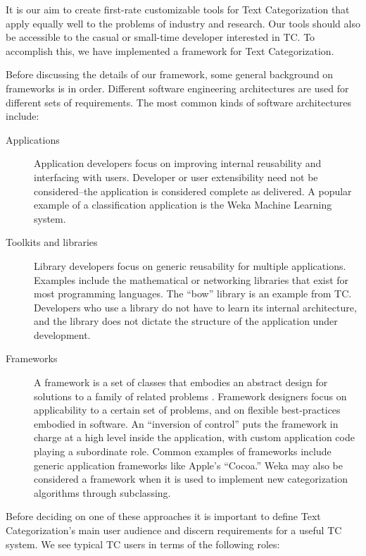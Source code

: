 \documentclass[a4paper,twocolumn]{article}
\begin{document}
It is our aim to create first-rate customizable tools for Text
Categorization that apply equally well to the problems of industry and
research.  Our tools should also be accessible to the casual or
small-time developer interested in TC.  To accomplish this, we have
implemented a framework for Text Categorization.

Before discussing the details of our framework, some general
background on frameworks is in order.  Different software engineering
architectures are used for different sets of requirements.  The most
common kinds of software architectures include:


\begin{description}
\item[Applications] Application developers focus on improving internal
reusability and interfacing with users.  Developer or user
extensibility need not be considered--the application is considered
complete as delivered.  A popular example of a classification
application is the Weka Machine Learning system.  \cite{weka:99}

\item[Toolkits and libraries] Library developers focus on generic
reusability for multiple applications.  Examples include the
mathematical or networking libraries that exist for most programming
languages.  The ``bow'' library \cite{bow:96} is an example from TC.
Developers who use a library do not have to learn its internal
architecture, and the library does not dictate the structure of the
application under development.  \cite{fayad:99}

\item[Frameworks] A framework is a set of classes that embodies an
abstract design for solutions to a family of related problems
\cite[Ch. 2]{fayad:99}.  Framework designers focus on applicability to
a certain set of problems, and on flexible best-practices embodied in
software.  An ``inversion of control'' puts the framework in charge at
a high level inside the application, with custom application code
playing a subordinate role.  Common examples of frameworks include
generic application frameworks like Apple's ``Cocoa.''  Weka may also
be considered a framework when it is used to implement new
categorization algorithms through subclassing.
\end{description}


Before deciding on one of these approaches it is important to define
Text Categorization's main user audience and discern requirements for
a useful TC system.  We see typical TC users in terms of the following
roles:
\end{document}
